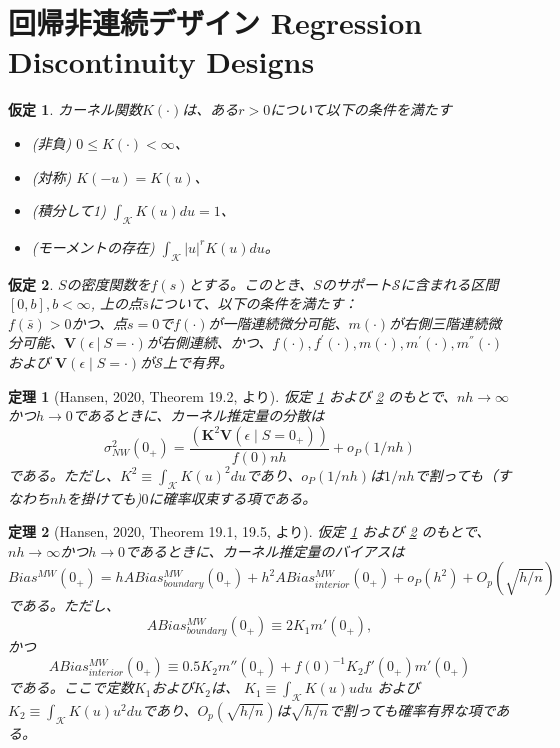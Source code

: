 \documentclass[a4paper]{bxjsarticle}
\newtheorem{theo}{定理}
\newtheorem{ass}{仮定}
\begin{document}
\section{回帰非連続デザイン Regression Discontinuity Designs}

\begin{ass} \label{ass:rd_kernel}
カーネル関数$K(\cdot)$は、ある$r > 0$について以下の条件を満たす
\begin{itemize}
    \item (非負) $0 \leq K(\cdot) < \infty$、
    \item (対称) $K(-u) = K(u)$、
    \item (積分して1) $\int_{\mathcal{K}} K(u) du = 1$、
    \item (モーメントの存在) $\int_{\mathcal{K}} |u|^r K(u) du$。
\end{itemize}
\end{ass}

\begin{ass} \label{ass:rd_smooth}
$S$の密度関数を$f(s)$とする。このとき、$S$のサポート$\mathcal{S}$に含まれる区間$[0,b],b < \infty$, 上の点$\bar{s}$について、以下の条件を満たす：\\
$f(\bar{s})>0$かつ、点$s=0$で$f(\cdot)$が一階連続微分可能、$m(\cdot)$が右側三階連続微分可能、$\mathbf{V}(\epsilon│S=\cdot)$が右側連続、かつ、$f(\cdot),f^{'} (\cdot),m(\cdot),m^{'} (\cdot),m^{''} (\cdot)$および $\mathbf{V}(\epsilon∣S= \cdot)$が$\mathcal{S}$上で有界。
\end{ass}

\begin{theo}[Hansen, 2020, Theorem 19.2, より]\label{thm:rd_kernel_est}
仮定 \ref{ass:rd_kernel} および \ref{ass:rd_smooth} のもとで、$nh \rightarrow \infty$かつ$h \rightarrow 0$であるときに、カーネル推定量の分散は
\[
 \sigma_{NW}^2 (0_+) = \frac{(\mathbf{K}^2  \mathbf{V}(\epsilon ∣S=0_+ ))}{f(0)nh} + o_P (1/nh)
\]
である。ただし、$K^2 \equiv \int_{\mathcal{K}} K(u)^2 du$であり、$o_P(1/nh)$は$1/nh$で割っても（すなわち$nh$を掛けても)$0$に確率収束する項である。
\end{theo}

\begin{theo}[Hansen, 2020, Theorem 19.1, 19.5, より]\label{thm:rd_kernel_est}
仮定 \ref{ass:rd_kernel} および \ref{ass:rd_smooth} のもとで、$nh \rightarrow \infty$かつ$h \rightarrow 0$であるときに、カーネル推定量のバイアスは
\[
 Bias^{MW}(0_+) = h ABias^{MW}_{boundary}(0_+) + h^2 ABias^{MW}_{interior}(0_+) + o_P(h^2) + O_p(\sqrt{h/n})
\]
である。ただし、
\[
 ABias^{MW}_{boundary}(0_+) \equiv 2 K_1 m'(0_+),
\]
かつ
\[
 ABias^{MW}_{interior}(0_+) \equiv 0.5 K_2 m''(0_+) + f(0)^{-1} K_2 f'(0_+) m'(0_+)
\]
である。ここで定数$K_1$および$K_2$は、
$K_1 \equiv \int_{\mathcal{K}} K(u) u du$ および $K_2 \equiv \int_{\mathcal{K}} K(u) u^2 du$であり、$O_p(\sqrt{h/n})$は$\sqrt{h/n}$で割っても確率有界な項である。
\end{theo}
\end{document}
